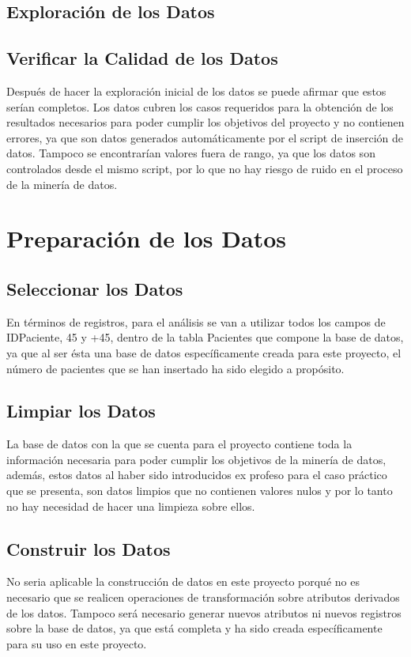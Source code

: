 \documentclass{article}
\begin{document}
\subsection{Exploración de los Datos}

\subsection{Verificar la Calidad de los Datos}
Después de hacer la exploración inicial de los datos se puede afirmar que estos serían completos. Los datos cubren los casos requeridos para la obtención de los resultados necesarios para poder cumplir los objetivos del proyecto y no contienen errores, ya que son datos generados automáticamente por el script de inserción de datos. Tampoco se encontrarían valores fuera de rango, ya que los datos son controlados desde el mismo script, por lo que no hay riesgo de ruido en el proceso de la minería de datos.

\section{Preparación de los Datos}

\subsection{Seleccionar los Datos}
En términos de registros, para el análisis se van a utilizar todos los campos de IDPaciente, 45 y +45, dentro de la tabla Pacientes que compone la base de datos, ya que al ser ésta una base de datos específicamente creada para este proyecto, el número de pacientes que se han insertado ha sido elegido a propósito. 

\subsection{Limpiar los Datos}
La base de datos con la que se cuenta para el proyecto contiene toda la información necesaria para poder cumplir los objetivos de la minería de datos, además, estos datos al haber sido introducidos ex profeso para el caso práctico que se presenta, son datos limpios que no contienen valores nulos y por lo tanto no hay necesidad de hacer una limpieza sobre ellos.

\subsection{Construir los Datos}\label{Construir los Datos}
No seria aplicable la construcción de datos en este proyecto porqué no es necesario que se realicen operaciones de transformación sobre atributos derivados de los datos. Tampoco será necesario generar nuevos atributos ni nuevos registros sobre la base de datos, ya que está completa y ha sido creada específicamente para su uso en este proyecto.
\end{document}
